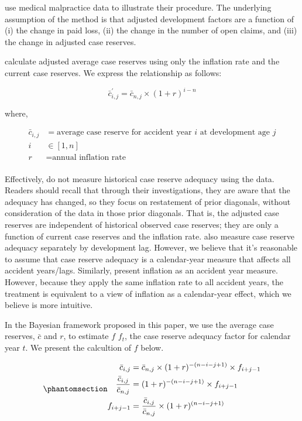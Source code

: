 \documentclass[
  letterpaper,
  DIV=11,
  numbers=noendperiod]{scrartcl}
\begin{document}
\bs use medical malpractice data to illustrate their procedure. The
underlying assumption of the \bs method is that adjusted development
factors are a function of (i) the change in paid loss, (ii) the change
in the number of open claims, and (iii) the change in adjusted case
reserves.

\bs calculate adjusted average case reserves using only the inflation
rate and the current case reserves. We express the relationship as
follows:

\[
\bar{c}^{'}_{i,j} = {\bar{c}_{n,j}} \times (1+r)^{i-n}
\]

where,

\[
\begin{aligned}
  \bar{c}_{i,j} &= \text{average case reserve for accident year } i \text{ at development age } j\\
i &\in [1, n]\\
r &= \text{annual inflation rate}\\
\end{aligned}
\]

Effectively, \bs do not measure historical case reserve adequacy using
the data. Readers should recall that through their investigations, they
are aware that the adequacy has changed, so they focus on restatement of
prior diagonals, without consideration of the data in those prior
diagonals. That is, the adjusted case reserves are independent of
historical observed case reserves; they are only a function of current
case reserves and the inflation rate. \bs also measure case reserve
adequacy separately by development lag. However, we believe that it's
reasonable to assume that case reserve adequacy is a calendar-year
measure that affects all accident years/lags. Similarly, \bs present
inflation as an accident year measure. However, because they apply the
same inflation rate to all accident years, the \bs treatment is
equivalent to a view of inflation as a calendar-year effect, which we
believe is more intuitive.

In the Bayesian framework proposed in this paper, we use the average
case reserves, \(\bar{c}\) and \(r\), to estimate \(f\) \(f_t\), the
case reserve adequacy factor for calendar year \(t\). We present the
calcultion of \(f\) below.

\begin{equation}\protect\phantomsection\label{eq-raf}{
\begin{aligned}
  \bar{c}_{i,j} &= {\bar{c}_{n,j}} \times (1+r)^{-(n-i-j+1)} \times f_{i+j-1}\\
  \frac{\bar{c}_{i,j}}{\bar{c}_{n,j}} &= (1+r)^{-(n-i-j+1)} \times f_{i+j-1}\\
  f_{i+j-1} &= \frac{\bar{c}_{i,j}}{\bar{c}_{n,j}} \times (1+r)^{(n-i-j+1)}\\
\end{aligned}
}\end{equation}
\end{document}
